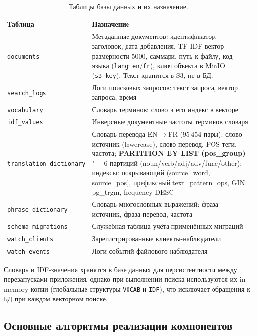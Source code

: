 \begin{table}[H]
	\centering
	\begin{tabular}{|p{3.2cm}|p{8.8cm}|}
		\hline
		\textbf{Таблица} & \textbf{Назначение} \\
		\hline
		\texttt{documents} & Метаданные документов: идентификатор, заголовок, дата добавления, TF-IDF-вектор размерности 5000, саммари, путь к файлу, код языка (\texttt{lang}: \texttt{en}/\texttt{fr}), ключ объекта в MinIO (\texttt{s3\_key}). Текст хранится в S3, не в БД. \\
		\hline
		\texttt{search\_logs} & Логи поисковых запросов: текст запроса, вектор запроса, время \\
		\hline
		\texttt{vocabulary} & Словарь терминов: слово и его индекс в векторе \\
		\hline
		\texttt{idf\_values} & Инверсные документные частоты терминов словаря \\
		\hline
		\texttt{translation\_dictionary} & Словарь перевода EN$\to$FR (95\,454 пары): слово-источник (lowercase), слово-перевод, POS-теги, частота; \textbf{PARTITION BY LIST (pos\_group)} "--- 6 партиций (noun/verb/adj/adv/func/other); индексы: покрывающий (source\_word, source\_pos), префиксный text\_pattern\_ops, GIN pg\_trgm, frequency DESC \\
		\hline
		\texttt{phrase\_dictionary} & Словарь многословных выражений: фраза-источник, фраза-перевод, частота \\
		\hline
		\texttt{schema\_migrations} & Служебная таблица учёта применённых миграций \\
		\hline
		\texttt{watch\_clients} & Зарегистрированные клиенты-наблюдатели \\
		\hline
		\texttt{watch\_events} & Логи событий файлового наблюдателя \\
		\hline
	\end{tabular}
	\caption{Таблицы базы данных и их назначение.}
	\label{tab:db_tables}
\end{table}

Словарь и IDF-значения хранятся в базе данных для персистентности между перезапусками
приложения, однако при выполнении поиска используются их in-memory копии (глобальные
структуры \texttt{VOCAB} и \texttt{IDF}), что исключает обращения к БД при каждом
векторном поиске.

\subsection{Основные алгоритмы реализации компонентов}

